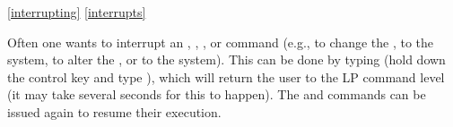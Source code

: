 \ref{interrupting}
\ref{interrupts}

Often one wants to interrupt an , , 
, or  command (e.g., to change the 
, to  the system, to alter
the , or to  the
system).  This can be done by typing  (hold down the control key and
type ), which will return the user to the LP command level (it may take
several seconds for this to happen).  The  and 
commands can be issued again to resume their execution.

